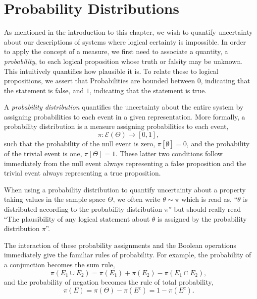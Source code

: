 \section{Probability Distributions}

As mentioned in the introduction to this chapter, we wish to quantify 
uncertainty about our descriptions of systems where logical certainty is 
impossible. In order to apply the concept of a measure, we first need to 
associate a quantity, a \emph{probability}, to each logical proposition 
whose truth or falsity may be unknown. This intuitively quantifies how 
plausible it is. To relate these to logical propositions, we assert that 
Probabilities are bounded between $0$, indicating that the statement is 
false, and $1$, indicating that the statement is true.

A \emph{probability distribution} quantifies the uncertainty about
the entire system by assigning probabilities to each event in a
given representation.  More formally, a probability distribution is
a measure assigning probabilities to each event,
%
\begin{equation*}
\pi : \mathcal{E} \! \left( \Theta \right) \rightarrow \left[0, 1 \right],
\end{equation*}
%
such that the probability of the null event is zero, 
$\pi \! \left[ \emptyset \right] = 0$, and the probability of the trivial
event is one, $\pi \! \left[ \Theta \right] = 1$.  These latter two 
conditions follow immediately from the null event always representing
a false proposition and the trivial event always representing a
true proposition.

When using a probability distribution to quantify uncertainty about 
a property taking values in the sample space $\Theta$, we often 
write $\theta \sim \pi$ which is read as, ``$\theta$ is distributed 
according to the probability distribution $\pi$'' but should really 
read ``The plausibility of any logical statement about $\theta$ 
is assigned by the probability distribution $\pi$''.

The interaction of these probability assignments and the Boolean
operations immediately give the familiar rules of probability.  For 
example, the probability of a conjunction becomes the sum rule,
%
\begin{equation*}
\pi \! \left( E_{1} \cup E_{2} \right)
= 
\pi \! \left( E_{1} \right) + \pi \! \left( E_{2} \right)
- \pi \! \left( E_{1} \cap E_{2} \right),
\end{equation*}
%
and the probability of negation becomes the rule of total probability,
%
\begin{equation*}
\pi \! \left( E \right)
= 
\pi \! \left( \Theta \right) - \pi \! \left( E^{c} \right)
=
1 - \pi \! \left( E^{c} \right).
\end{equation*}

